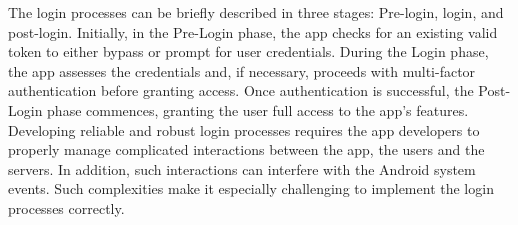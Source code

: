  
The login processes can be briefly described in three stages: Pre-login, login, and post-login. Initially, in the Pre-Login phase, the app checks for an existing valid token to either bypass or prompt for user credentials. During the Login phase, the app assesses the credentials and, if necessary, proceeds with multi-factor authentication before granting access. Once authentication is successful, the Post-Login phase commences, granting the user full access to the app's features.
 Developing reliable and robust login processes requires the app developers to properly manage complicated interactions between the app, the users and the servers.
 In addition, such interactions can interfere with the Android system events.
 Such complexities make it especially challenging to implement the login processes correctly.

